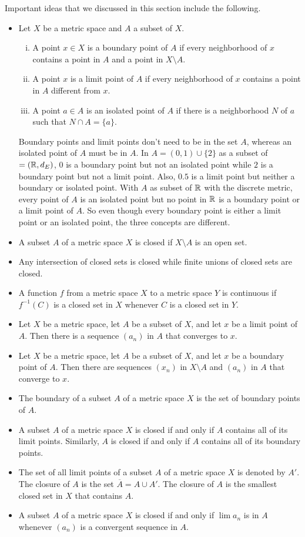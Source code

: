 \label{sec_closed_set_summ}
Important ideas that we discussed in this section include the following.
\begin{itemize}
\item Let $X$ be a metric space and $A$ a subset of $X$. 
	\begin{enumerate}[i.]
	\item A point $x \in X$ is a boundary point of $A$ if every neighborhood of $x$ contains a point in $A$ and a point in $X \setminus A$. 
	\item A point $x$ is a limit point of $A$ if every neighborhood of $x$ contains a point in $A$ different from $x$.
	\item A point $a \in A$ is an isolated point of $A$ if there is a neighborhood $N$ of $a$ such that $N \cap A = \{a\}$. 
	\end{enumerate}
	Boundary points and limit points don't need to be in the set $A$, whereas an isolated point of $A$ must be in $A$. In $A = (0,1) \cup \{2\}$ as a subset of $=(\mathbb{R}, d_E)$, $0$ is a boundary point but not an isolated point while $2$ is a boundary point but not a limit point. Also, $0.5$ is a limit point but neither a boundary or isolated point. With $A$ as subset of $\mathbb{R}$ with the discrete metric, every point of $A$ is an isolated point but no point in $\mathbb{R}$ is a boundary point or a limit point of $A$. So even though every boundary point is either a limit point or an isolated point, the three concepts are different.
\item A subset $A$ of a metric space $X$ is closed if $X \setminus A$ is an open set. 
\item Any intersection of closed sets is closed while finite unions of closed sets are closed. 
\item A function $f$ from a metric space $X$ to a metric space $Y$ is continuous if $f^{-1}(C)$ is a closed set in $X$ whenever $C$ is a closed set in $Y$. 
\item Let $X$ be a metric space, let $A$ be a subset of $X$, and let $x$ be a limit point of $A$. Then there is a sequence $(a_n)$ in $A$ that converges to $x$.
\item Let $X$ be a metric space, let $A$ be a subset of $X$, and let $x$ be a boundary point of $A$. Then there are sequences $(x_n)$ in $X \setminus A$ and $(a_n)$ in $A$ that converge to $x$.
\item The boundary of a subset $A$ of a metric space $X$ is the set of boundary points of $A$. 
\item A subset $A$ of a metric space $X$ is closed if and only if $A$ contains all of its limit points. Similarly, $A$ is closed if and only if $A$ contains all of its boundary points.  
\item The set of all limit points of a subset $A$ of a metric space $X$ is denoted by $A'$. The closure of $A$ is the set $\overline{A} = A \cup A'$. The closure of $A$ is the smallest closed set in $X$ that contains $A$. 
\item A subset $A$ of a metric space $X$ is closed if and only if $\lim a_n$ is in $A$ whenever $(a_n)$ is a convergent sequence in $A$. 
\end{itemize}

